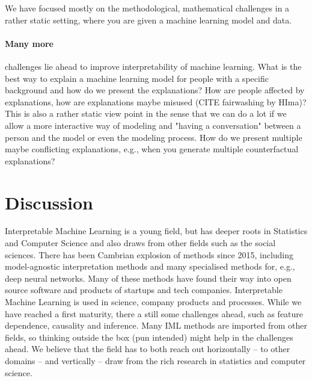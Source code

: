 \documentclass[runningheads]{llncs}
\begin{document}
We have focused mostly on the methodological, mathematical challenges in a rather static setting, where you are given a machine learning model and data.
\paragraph{Many more} challenges lie ahead to improve interpretability of machine learning.
What is the best way to explain a machine learning model for people with a specific background and how do we present the explanations?
How are people affected by explanations, how are explanations maybe misused (CITE fairwashing by HIma)?
This is also a rather static view point in the sense that we can do a lot if we allow a more interactive way of modeling and "having a conversation" between a person and the model or even the modeling process.
How do we present multiple maybe conflicting explanations, e.g., when you generate multiple counterfactual explanations?

\section{Discussion}

Interpretable Machine Learning is a young field, but has deeper roots in Statistics and Computer Science and also draws from other fields such as the social sciences.
There has been Cambrian explosion of methods since 2015, including model-agnostic interpretation methods and many specialised methods for, e.g., deep neural networks.
Many of these methods have found their way into open source software and products of startups and tech companies.
Interpretable Machine Learning is used in science, company products and processes.
While we have reached a first maturity, there a still some challenges ahead, such as feature dependence, causality and inference.
Many IML methods are imported from other fields, so thinking outside the box (pun intended) might help in the challenges ahead.
We believe that the field has to both reach out horizontally -- to other domains -- and vertically -- draw from the rich research in statistics and computer science.


%
%
%
% 
%

\vskip 0.2in


\end{document}
